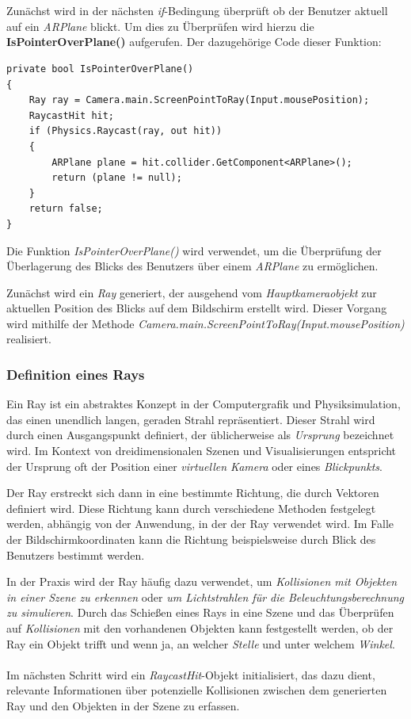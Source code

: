 \\
\\
Zunächst wird in der nächsten \textit{if}-Bedingung überprüft ob der Benutzer aktuell auf ein \textit{ARPlane} blickt. Um
dies zu Überprüfen wird hierzu die \textbf{IsPointerOverPlane()} aufgerufen. Der dazugehörige Code dieser Funktion:
\begin{lstlisting}[style=csharp, caption={Überprüfen ob Benutzer auf ARPlane blickt}, label=code:isPOP]
private bool IsPointerOverPlane()
{
    Ray ray = Camera.main.ScreenPointToRay(Input.mousePosition);
    RaycastHit hit;
    if (Physics.Raycast(ray, out hit))
    {
        ARPlane plane = hit.collider.GetComponent<ARPlane>();
        return (plane != null);
    }
    return false;
}
\end{lstlisting}
Die Funktion \textit{IsPointerOverPlane()} wird verwendet, um die Überprüfung der Überlagerung des Blicks des Benutzers
über einem \textit{ARPlane} zu ermöglichen.

Zunächst wird ein \textit{Ray} generiert, der ausgehend vom \textit{Hauptkameraobjekt} zur aktuellen Position des Blicks
auf dem Bildschirm erstellt wird. Dieser Vorgang wird mithilfe der Methode \textit{Camera.main.ScreenPointToRay(Input.mousePosition)}
realisiert.

\subsubsection*{Definition eines Rays} %
Ein Ray ist ein abstraktes Konzept in der Computergrafik und Physiksimulation, das einen unendlich langen, geraden Strahl
repräsentiert. Dieser Strahl wird durch einen Ausgangspunkt definiert, der üblicherweise als \textit{Ursprung} bezeichnet
wird. Im Kontext von dreidimensionalen Szenen und Visualisierungen entspricht der Ursprung oft der Position einer
\textit{virtuellen Kamera} oder eines \textit{Blickpunkts}.

Der Ray erstreckt sich dann in eine bestimmte Richtung, die durch Vektoren definiert wird. Diese Richtung kann durch
verschiedene Methoden festgelegt werden, abhängig von der Anwendung, in der der Ray verwendet wird. Im Falle der
Bildschirmkoordinaten kann die Richtung beispielsweise durch  Blick des Benutzers bestimmt werden.

In der Praxis wird der Ray häufig dazu verwendet, um \textit{Kollisionen mit Objekten in einer Szene zu erkennen} oder
\textit{um Lichtstrahlen für die Beleuchtungsberechnung zu simulieren}. Durch das Schießen eines Rays in eine Szene und
das Überprüfen auf \textit{Kollisionen} mit den vorhandenen Objekten kann festgestellt werden, ob der Ray ein Objekt
trifft und wenn ja, an welcher \textit{Stelle} und unter welchem \textit{Winkel}.\\
\\
Im nächsten Schritt wird ein \textit{RaycastHit}-Objekt initialisiert, das dazu dient, relevante Informationen über
potenzielle Kollisionen zwischen dem generierten Ray und den Objekten in der Szene zu erfassen.

